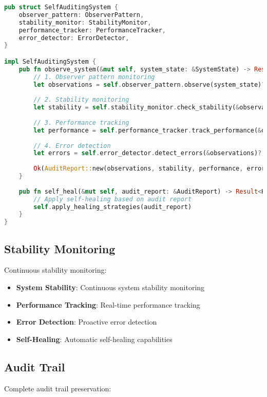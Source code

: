 \documentclass[12pt,a4paper]{article}
\begin{document}
\begin{lstlisting}[language=Rust, caption=Self-Auditing Implementation]
pub struct SelfAuditingSystem {
    observer_pattern: ObserverPattern,
    stability_monitor: StabilityMonitor,
    performance_tracker: PerformanceTracker,
    error_detector: ErrorDetector,
}

impl SelfAuditingSystem {
    pub fn observe_system(&mut self, system_state: &SystemState) -> Result<AuditReport> {
        // 1. Observer pattern monitoring
        let observations = self.observer_pattern.observe(system_state)?;
        
        // 2. Stability monitoring
        let stability = self.stability_monitor.check_stability(&observations)?;
        
        // 3. Performance tracking
        let performance = self.performance_tracker.track_performance(&observations)?;
        
        // 4. Error detection
        let errors = self.error_detector.detect_errors(&observations)?;
        
        Ok(AuditReport::new(observations, stability, performance, errors))
    }
    
    pub fn self_heal(&mut self, audit_report: &AuditReport) -> Result<HealingResult> {
        // Apply self-healing based on audit report
        self.apply_healing_strategies(audit_report)
    }
}
\end{lstlisting}

\subsection{Stability Monitoring}
Continuous stability monitoring:

\begin{itemize}
    \item \textbf{System Stability}: Continuous system stability monitoring
    \item \textbf{Performance Tracking}: Real-time performance tracking
    \item \textbf{Error Detection}: Proactive error detection
    \item \textbf{Self-Healing}: Automatic self-healing capabilities
\end{itemize}

\subsection{Audit Trail}
Complete audit trail preservation:
\end{document}
